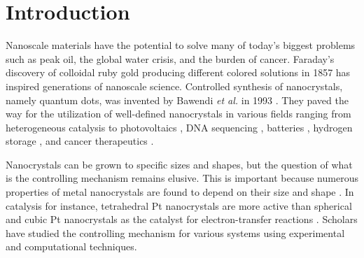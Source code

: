 
\section{Introduction}


Nanoscale materials have the potential to solve many of today's biggest problems such as peak oil, the global water crisis, and the burden of cancer.
Faraday's discovery of colloidal ruby gold producing different colored solutions in 1857 \cite{Faraday_1857,Thompson_2007} has inspired generations of nanoscale science.
Controlled synthesis of nanocrystals, namely quantum dots, was invented by Bawendi \textit{et al.} in 1993 \cite{hakimi1993quantum,Murray_2000}.
They paved the way for the utilization of well-defined nanocrystals in various fields ranging from heterogeneous catalysis \cite{astruc2008nanoparticles,Astruc_2006} to photovoltaics \cite{Atwater_2010}, DNA sequencing \cite{McNally_2010}, batteries \cite{Panniello_2014}, hydrogen storage \cite{Jena_2011,Ramos_Castillo_2015}, and cancer therapeutics \cite{Jain_2010,Kim_2010}.


Nanocrystals can be grown to specific sizes and shapes, but the question of what is the controlling mechanism remains elusive.
This is important because numerous properties of metal nanocrystals are found to depend on their size \cite{Roduner_2006} and shape \cite{Xia_2008}.
In catalysis for instance, tetrahedral Pt nanocrystals are more active than spherical and cubic Pt nanocrystals as the catalyst for electron-transfer reactions \cite{Narayanan_2005}.
Scholars have studied the controlling mechanism for various systems using experimental and computational techniques.
